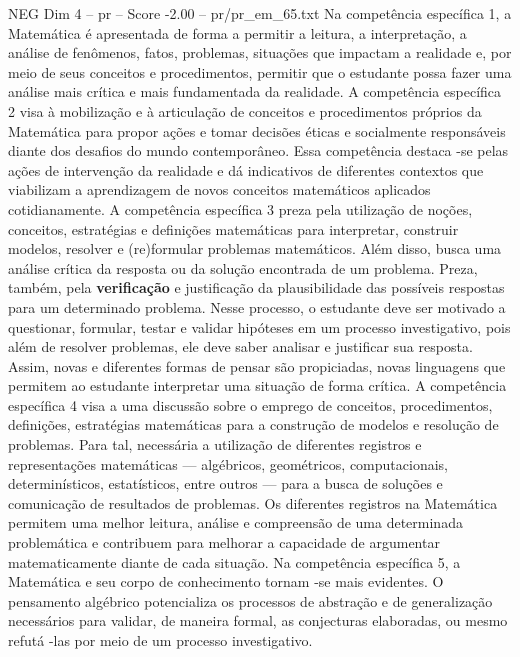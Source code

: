 \begin{textsample}{NEG Dim 4 – pr – Score -2.00 – pr/pr\_em\_65.txt}  \label{ex:f4_neg_109}
Na competência específica 1, a Matemática é apresentada de forma a permitir a leitura, a interpretação, a análise de fenômenos, fatos, problemas, situações que impactam a realidade e, por meio de seus conceitos e procedimentos, permitir que o estudante possa fazer uma análise mais crítica e mais fundamentada da realidade.
A competência específica 2 visa à mobilização e à articulação de conceitos e procedimentos próprios da Matemática para propor ações e tomar decisões éticas e socialmente responsáveis diante dos desafios do mundo contemporâneo.
Essa competência destaca -se pelas ações de intervenção da realidade e dá indicativos de diferentes contextos que viabilizam a aprendizagem de novos conceitos matemáticos aplicados cotidianamente.
A competência específica 3 preza pela utilização de noções, conceitos, estratégias e definições matemáticas para interpretar, construir modelos, resolver e (re)formular problemas matemáticos.
Além disso, busca uma análise crítica da resposta ou da solução encontrada de um problema.
Preza, também, pela \textbf{verificação} e justificação da plausibilidade das possíveis respostas para um determinado problema.
Nesse processo, o estudante deve ser motivado a questionar, formular, testar e validar hipóteses em um processo investigativo, pois além de resolver problemas, ele deve saber analisar e justificar sua resposta.
Assim, novas e diferentes formas de pensar são propiciadas, novas linguagens que permitem ao estudante interpretar uma situação de forma crítica.
A competência específica 4 visa a uma discussão sobre o emprego de conceitos, procedimentos, definições, estratégias matemáticas para a construção de modelos e resolução de problemas.
Para tal, necessária a utilização de diferentes registros e representações matemáticas — algébricos, geométricos, computacionais, determinísticos, estatísticos, entre outros — para a busca de soluções e comunicação de resultados de problemas.
Os diferentes registros na Matemática permitem uma melhor leitura, análise e compreensão de uma determinada problemática e contribuem para melhorar a capacidade de argumentar matematicamente diante de cada situação.
Na competência específica 5, a Matemática e seu corpo de conhecimento tornam -se mais evidentes.
O pensamento algébrico potencializa os processos de abstração e de generalização necessários para validar, de maneira formal, as conjecturas elaboradas, ou mesmo refutá -las por meio de um processo investigativo.

\end{textsample}
